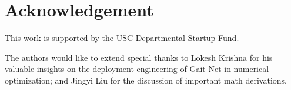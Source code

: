 \section{Acknowledgement}
\label{sec:Acknowledgement}

This work is supported by the USC Departmental Startup Fund.

The authors would like to extend special thanks to Lokesh Krishna for his valuable insights on the deployment engineering of Gait-Net in numerical optimization; and Jingyi Liu for the discussion of important math derivations.

